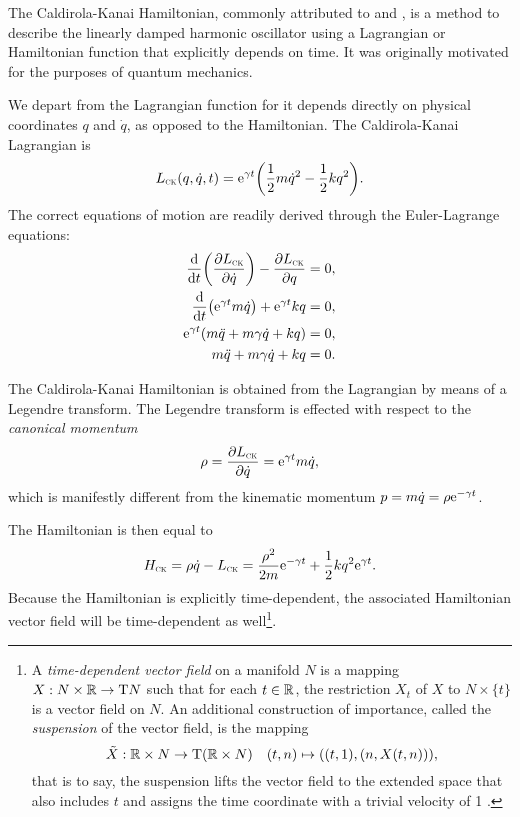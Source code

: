 The Caldirola-Kanai Hamiltonian, commonly attributed to \citet{Caldirola1941} and \citet{Kanai1948}, is a method to describe the linearly damped harmonic oscillator using a Lagrangian or Hamiltonian function that explicitly depends on time. It was originally motivated for the purposes of quantum mechanics.

We depart from the Lagrangian function for it depends directly on physical coordinates \(q\) and \(\dot{q}\), as opposed to the Hamiltonian. The Caldirola-Kanai Lagrangian is
\begin{equation}
    L_\text{\tiny{\textsc{CK}}}(q, \dot{q}, t) = \mathrm{e}^{\gamma t}\qty(\frac{1}{2}m\dot{q}^2 - \frac{1}{2}kq^2).
    \label{eq:lag_CK}
\end{equation}
The correct equations of motion are readily derived through the Euler-Lagrange equations:
\begin{equation}
    \begin{split}
        \dv{}{t}\qty(\pdv{\ensuremath{L_\text{\tiny{\textsc{CK}}}}}{\dot{q}}) - \pdv{\ensuremath{L_\text{\tiny{\textsc{CK}}}}}{q} &= 0, \\
        \dv{}{t}\qty(\mathrm{e}^{\gamma t } m \dot{q}) + \mathrm{e}^{\gamma t} kq &= 0, \\
        \mathrm{e}^{\gamma t } \qty(m\ddot{q} + m\gamma\dot{q} + kq)  &= 0, \\
        m\ddot{q} + m\gamma\dot{q} + kq &= 0. \\
    \end{split}
\end{equation}

The Caldirola-Kanai Hamiltonian is obtained from the Lagrangian by means of a Legendre transform. The Legendre transform is effected with respect to the \emph{canonical momentum}
\begin{equation}
     \rho = \pdv{\ensuremath{L_\text{\tiny{\textsc{CK}}}}}{\dot{q}} = \mathrm{e}^{\gamma t} m \dot{q},
\end{equation}
which is manifestly different from the kinematic momentum \(p = m\dot{q} = \rho \mathrm{e}^{-\gamma t}\).

The Hamiltonian is then equal to
\begin{equation}
     H_\text{\tiny{\textsc{CK}}} = \rho\dot{q} - L_\text{\tiny{\textsc{CK}}} =  \frac{\rho^2}{2m}\mathrm{e}^{-\gamma t} + \frac{1}{2}kq^2\mathrm{e}^{\gamma t}.
\end{equation}
Because the Hamiltonian is explicitly time-dependent, the associated Hamiltonian vector field will be time-dependent as well\footnote
{A \emph{time-dependent vector field} on a manifold \(N\) is a mapping \(X: N\times\mathbb{R} \to \mathrm{T}N\) such that for each \(t \in \mathbb{R}\), the restriction \(X_t\) of \(X\) to \(N \times \{t\}\) is a vector field on \(N\). \cite{Libermann1987} An additional construction of importance, called the \emph{suspension} of the vector field, is the mapping \begin{equation}
     \tilde{X}: \mathbb{R} \times N \to \mathrm{T}(\mathbb{R} \times N) \quad (t, n) \mapsto ((t, 1), (n, X(t, n))),
\end{equation} that is to say, the suspension lifts the vector field to the extended space that also includes \(t\) and assigns the time coordinate with a trivial velocity of 1 \cite{Abraham1978}.}.

